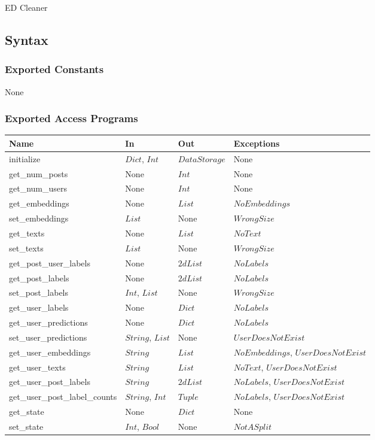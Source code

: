 \documentclass[12pt, titlepage]{article}
\begin{document}
ED Cleaner

\subsection{Syntax}

\subsubsection{Exported Constants}

None

\subsubsection{Exported Access Programs}

\begin{center}
\begin{tabular}{p{5cm} p{3cm} p{2cm} p{6cm}}
\hline
\textbf{Name} & \textbf{In} & \textbf{Out} & \textbf{Exceptions} \\
\hline
initialize & $Dict$, $Int$ & $DataStorage$ & None \\
get\_num\_posts & None & $Int$ & None \\
get\_num\_users & None & $Int$ & None \\
get\_embeddings & None & $List$ & $NoEmbeddings$ \\
set\_embeddings & $List$ & None & $WrongSize$ \\
get\_texts & None & $List$ & $NoText$ \\
set\_texts & $List$ & None & $WrongSize$ \\
get\_post\_user\_labels & None & $2d List$ & $NoLabels$ \\
get\_post\_labels & None & $2d List$ & $NoLabels$ \\
set\_post\_labels & $Int$, $List$ & None & $WrongSize$ \\
get\_user\_labels & None & $Dict$ & $NoLabels$ \\
get\_user\_predictions & None & $Dict$ & $NoLabels$ \\
set\_user\_predictions & $String$, $List$ & None & $UserDoesNotExist$ \\
get\_user\_embeddings & $String$ & $List$ & $NoEmbeddings$, $UserDoesNotExist$ \\
get\_user\_texts & $String$ & $List$ & $NoText$, $UserDoesNotExist$ \\
get\_user\_post\_labels & $String$ & $2d List$ & $NoLabels$, $UserDoesNotExist$ \\
get\_user\_post\_label\_counts & $String$, $Int$ & $Tuple$ & $NoLabels$, $UserDoesNotExist$ \\
get\_state & None & $Dict$ & None \\
set\_state & $Int$, $Bool$ & None & $NotASplit$ \\

\hline

\end{tabular}
\end{center}
\end{document}
